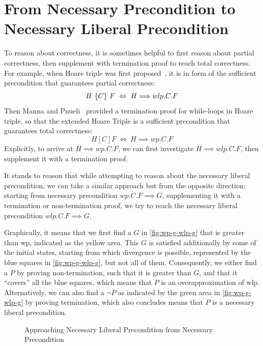 \section{From Necessary Precondition to Necessary Liberal Precondition}\label{sec:np-nlp}
To reason about correctness, it is sometimes helpful to first reason about partial correctness, then supplement with termination proof to reach total correctness. 
For example, when Hoare triple was first proposed~\cite{hoare69}, it is in form of the sufficient precondition that guarantees partial correctness: 
$$\hoarenm{H}C F\ \Leftrightarrow\  H{\implies} wlp.C.F$$
Then Manna and Pnueli~\cite{manna74} provided a termination proof for while-loops in Hoare triple, so that the extended Hoare Triple is a sufficient precondition that guarantees total correctness: 
$${H}[C] F\ \Leftrightarrow\ H{\implies} wp.C.F$$
Explicitly, to arrive at $H\implies wp.C.F$, we can first investigate $H\implies wlp.C.F$, then supplement it with a termination proof.

It stands to reason that while attempting to reason about the necessary liberal precondition, we can take a similar approach but from the opposite direction: starting from necessary precondition $wp.C.F \implies G$, supplementing it with a termination or non-termination proof, we try to reach the necessary liberal precondition $wlp.C.F\implies G$. 

Graphically, it means that we first find a $G$ in \autoref{fig:wp-g-wlp-g} that is greater than wp, indicated as the yellow area. 
This $G$ is satisfied additionally by some of the initial states, starting from which divergence is possible, represented by the blue squares in \autoref{fig:wp-g-wlp-g}, but not all of them. 
Consequently, we either find a $P$ by proving non-termination, such that it is greater than $G$, and that it ``covers'' all the blue squares, which means that $P$ is an overapproximation of wlp. 
Alternatively, we can also find a $\neg P$ as indicated by the green area in \autoref{fig:wp-g-wlp-g} by proving termination, which also concludes means that $P$ is a necessary liberal precondition. 

\begin{figure}[ht]
	\centering
	
	\caption{Approaching Necessary Liberal Precondition from Necessary Precondition}
	\label{fig:wp-g-wlp-g}
\end{figure}

